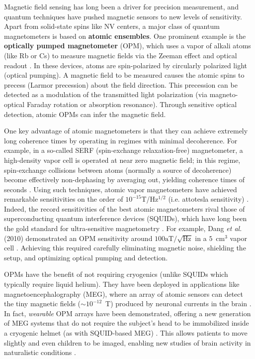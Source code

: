 Magnetic field sensing has long been a driver for precision
measurement, and quantum techniques have pushed magnetic sensors to
new levels of sensitivity. Apart from solid-state spins like NV
centers, a major class of quantum magnetometers is based on
\textbf{atomic ensembles}. One prominent example is the
\textbf{optically pumped magnetometer} (OPM), which uses a vapor of
alkali atoms (like Rb or Cs) to measure magnetic fields via the Zeeman
effect and optical readout . In these devices, atoms are
spin-polarized by circularly polarized light (optical pumping). A
magnetic field to be measured causes the atomic spins to precess
(Larmor precession) about the field direction. This precession can be
detected as a modulation of the transmitted light polarization (via
magneto-optical Faraday rotation or absorption resonance). Through
sensitive optical detection, atomic OPMs can infer the magnetic field.



One key advantage of atomic magnetometers is that they can achieve
extremely long coherence times by operating in regimes with minimal
decoherence. For example, in a so-called SERF (spin-exchange
relaxation-free) magnetometer, a high-density vapor cell is operated
at near zero magnetic field; in this regime, spin-exchange collisions
between atoms (normally a source of decoherence) become effectively
non-dephasing by averaging out, yielding coherence times of seconds
. Using such techniques, atomic vapor magnetometers have achieved
remarkable sensitivities on the order of $10^{-15}$T/Hz$^{1/2}$
(i.e. attotesla sensitivity) . Indeed, the record sensitivities of the
best atomic magnetometers rival those of superconducting quantum
interference devices (SQUIDs), which have long been the gold standard
for ultra-sensitive magnetometry . For example, Dang \emph{et al.}
(2010) demonstrated an OPM sensitivity around
$100\text{aT}/\sqrt{\text{Hz}}$ in a $5$~cm$^3$ vapor cell . Achieving
this required carefully eliminating magnetic noise, shielding the
setup, and optimizing optical pumping and detection.



OPMs have the benefit of not requiring cryogenics (unlike SQUIDs which
typically require liquid helium). They have been deployed in
applications like magnetoencephalography (MEG), where an array of
atomic sensors can detect the tiny magnetic fields
($\sim$$10^{-12}$~T) produced by neuronal currents in the brain . In
fact, \emph{wearable} OPM arrays have been demonstrated, offering a
new generation of MEG systems that do not require the subject’s head
to be immobilized inside a cryogenic helmet (as with SQUID-based MEG)
. This allows patients to move slightly and even children to be
imaged, enabling new studies of brain activity in naturalistic
conditions .




